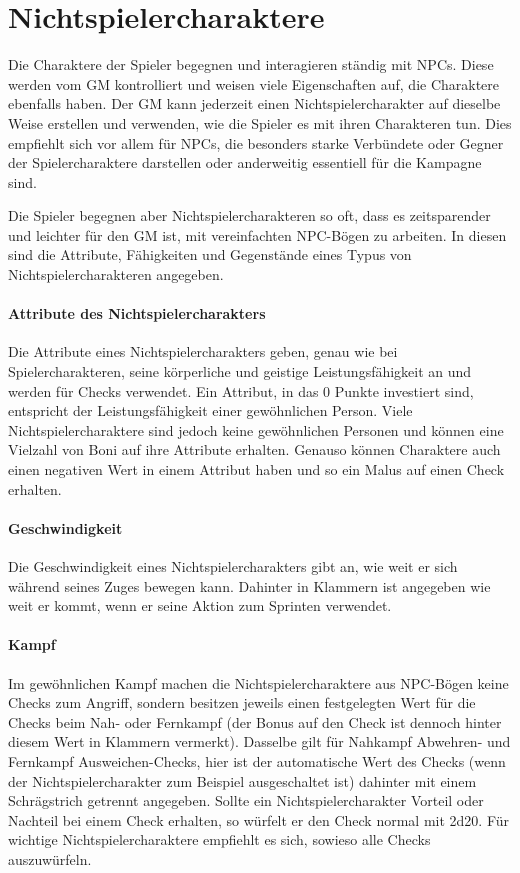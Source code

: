 \chapter{Nichtspielercharaktere}
Die Charaktere der Spieler begegnen und interagieren ständig mit NPCs. Diese werden vom GM kontrolliert und weisen viele Eigenschaften auf, die Charaktere ebenfalls haben.
Der GM kann jederzeit einen Nichtspielercharakter auf dieselbe Weise erstellen und verwenden, wie die Spieler es mit ihren Charakteren tun. Dies empfiehlt sich vor allem für NPCs, die besonders starke Verbündete oder Gegner der Spielercharaktere darstellen oder anderweitig essentiell für die Kampagne sind.

Die Spieler begegnen aber Nichtspielercharakteren so oft, dass es zeitsparender und leichter für den GM ist, mit vereinfachten NPC-Bögen zu arbeiten. In diesen sind die Attribute, Fähigkeiten und Gegenstände eines Typus von Nichtspielercharakteren angegeben.
\subsubsection{Attribute des Nichtspielercharakters}
Die Attribute eines Nichtspielercharakters geben, genau wie bei Spielercharakteren, seine körperliche und geistige Leistungsfähigkeit an und werden für Checks verwendet. Ein Attribut, in das 0 Punkte investiert sind, entspricht der Leistungsfähigkeit einer gewöhnlichen Person. Viele Nichtspielercharaktere sind jedoch keine gewöhnlichen Personen und können eine Vielzahl von Boni auf ihre Attribute erhalten. Genauso können Charaktere auch einen negativen Wert in einem Attribut haben und so ein Malus auf einen Check erhalten.
\subsubsection{Geschwindigkeit}
Die Geschwindigkeit eines Nichtspielercharakters gibt an, wie weit er sich während seines Zuges bewegen kann. Dahinter in Klammern ist angegeben wie weit er kommt, wenn er seine Aktion zum Sprinten verwendet.
\subsubsection{Kampf}
Im gewöhnlichen Kampf machen die Nichtspielercharaktere aus NPC-Bögen keine Checks zum Angriff, sondern besitzen jeweils einen festgelegten Wert für die Checks beim Nah- oder Fernkampf (der Bonus auf den Check ist dennoch hinter diesem Wert in Klammern vermerkt). Dasselbe gilt für Nahkampf Abwehren- und Fernkampf Ausweichen-Checks, hier ist der automatische Wert des Checks (wenn der Nichtspielercharakter zum Beispiel ausgeschaltet ist) dahinter mit einem Schrägstrich getrennt angegeben.
Sollte ein Nichtspielercharakter Vorteil oder Nachteil bei einem Check erhalten, so würfelt er den Check normal mit 2d20. Für wichtige Nichtspielercharaktere empfiehlt es sich, sowieso alle Checks auszuwürfeln.
